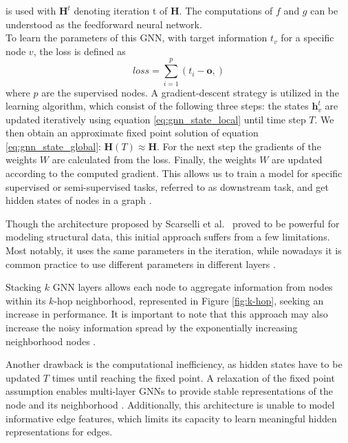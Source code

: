 is used with $\mathbf{H}^{t}$ denoting iteration t of $\mathbf{H}$. The computations of $f$ and $g$ can be understood as the feedforward neural network. \\
To learn the parameters of this GNN, with target information $t_v$ for a specific node $v$, the loss is defined as
\begin{equation}
    loss = \sum_{i=1}^p (t_i-\mathbf{o},)
\end{equation}
where $p$ are the supervised nodes. A gradient-descent strategy is utilized in the learning algorithm, which consist of the following three steps: the states $\mathbf{h}_v^{t}$ are updated iteratively using equation \eqref{eq:gnn_state_local} until time step $T$. We then obtain an approximate fixed point solution of equation \eqref{eq:gnn_state_global}: $\mathbf{H}(T)\approx\mathbf{H}$. For the next step the gradients of the weights $W$ are calculated from the loss. Finally, the weights $W$ are updated according to the computed gradient. This allows us to train a model for specific supervised or semi-supervised tasks, referred to as downstream task, and get hidden states of nodes in a graph \cite{Liu2020}. \bigskip

Though the architecture proposed by Scarselli et al.~\cite{4700287} proved to be powerful for modeling structural data, this initial approach suffers from a few limitations. Most notably, it uses the same parameters in the iteration, while nowadays it is common practice to use different parameters in different layers \cite{Liu2020}. 

Stacking $k$ GNN layers allows each node to aggregate information from nodes within its $k$-hop neighborhood, represented in Figure \ref{fig:k-hop}, seeking an increase in performance. It is important to note that this approach may also increase the noisy information spread by the exponentially increasing neighborhood nodes \cite{Liu2020}.

Another drawback is the computational inefficiency, as hidden states have to be updated $T$ times until reaching the fixed point. A relaxation of the fixed point assumption enables multi-layer GNNs to provide stable representations of the node and its neighborhood \cite{li2015gated}. Additionally, this architecture is unable to model informative edge features, which limits its capacity to learn meaningful hidden representations for edges.

